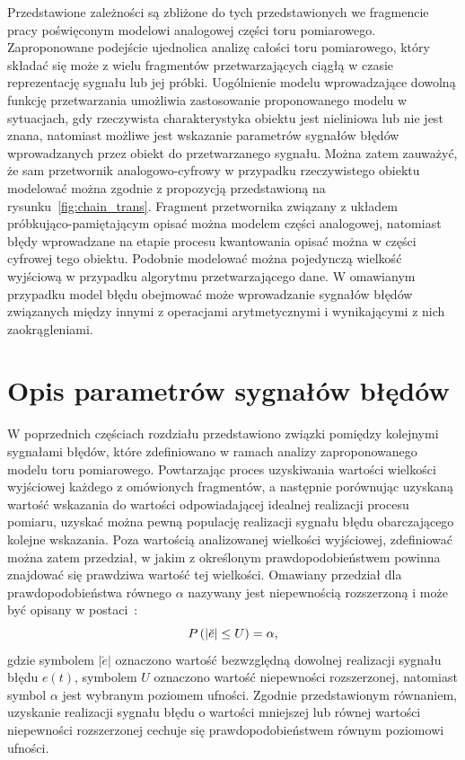 Przedstawione zależności są zbliżone do tych przedstawionych we fragmencie pracy poświęconym modelowi analogowej części toru pomiarowego. Zaproponowane podejście ujednolica analizę całości toru pomiarowego, który składać się może z wielu fragmentów przetwarzających ciągłą w czasie reprezentację sygnału lub jej próbki. Uogólnienie modelu wprowadzające dowolną funkcję przetwarzania umożliwia zastosowanie proponowanego modelu w sytuacjach, gdy rzeczywista charakterystyka obiektu jest nieliniowa lub nie jest znana, natomiast możliwe jest wskazanie parametrów sygnałów błędów wprowadzanych przez obiekt do przetwarzanego sygnału. Można zatem zauważyć, że sam przetwornik analogowo-cyfrowy w przypadku rzeczywistego obiektu modelować można zgodnie z propozycją przedstawioną na rysunku~\ref{fig:chain_trans}. Fragment przetwornika związany z układem próbkująco-pamiętającym opisać można modelem części analogowej, natomiast błędy wprowadzane na etapie procesu kwantowania opisać można w części cyfrowej tego obiektu. Podobnie modelować można pojedynczą wielkość wyjściową w przypadku algorytmu przetwarzającego dane. W omawianym przypadku model błędu obejmować może wprowadzanie sygnałów błędów związanych między innymi z operacjami arytmetycznymi i wynikającymi z nich zaokrągleniami.

\section{Opis parametrów sygnałów błędów}

W poprzednich częściach rozdziału przedstawiono związki pomiędzy kolejnymi sygnałami błędów, które zdefiniowano w ramach analizy zaproponowanego modelu toru pomiarowego. Powtarzając proces uzyskiwania wartości wielkości wyjściowej każdego z omówionych fragmentów, a następnie porównując uzyskaną wartość wskazania do wartości odpowiadającej idealnej realizacji procesu pomiaru, uzyskać można pewną populację realizacji sygnału błędu obarczającego kolejne wskazania. Poza wartością analizowanej wielkości wyjściowej, zdefiniować można zatem przedział, w jakim z określonym prawdopodobieństwem powinna znajdować się prawdziwa wartość tej wielkości. Omawiany przedział dla prawdopodobieństwa równego $\alpha$ nazywany jest niepewnością rozszerzoną i może być opisany w postaci~\cite{jcgm_guide}:
\begin{equation}
P \left(|\breve{e}| \le U\right) = \alpha \label{eq:unc_definition},
\end{equation}
gdzie symbolem $|\breve{e}|$ oznaczono wartość bezwzględną dowolnej realizacji sygnału błędu $e(t)$, symbolem $U$ oznaczono wartość niepewności rozszerzonej, natomiast symbol $\alpha$ jest wybranym poziomem ufności. Zgodnie przedstawionym równaniem, uzyskanie realizacji sygnału błędu o wartości mniejszej lub równej wartości niepewności rozszerzonej cechuje się prawdopodobieństwem równym poziomowi ufności.

